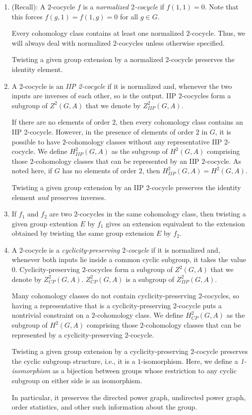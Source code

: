 \documentclass[10pt]{amsart}
\begin{document}
\begin{enumerate}
\item (Recall): A $2$-cocycle $f$ is a {\em normalized $2$-cocycle} if
  $f(1,1) = 0$. Note that this forces $f(g,1) = f(1,g) = 0$ for all $g
  \in G$.

  Every cohomology class contains at least one normalized
  $2$-cocycle. Thus, we will always deal with normalized $2$-cocycles
  unless otherwise specified.

  Twisting a given group extension by a normalized 2-cocycle preserves
  the identity element.

\item A $2$-cocycle is an {\em IIP 2-cocycle} if it is normalized and,
  whenever the two inputs are inverses of each other, so is the
  output. IIP 2-cocycles form a subgroup of $Z^2(G,A)$ that we denote
  by $Z^2_{IIP}(G,A)$.

  If there are no elements of order $2$, then every cohomology class
  contains an IIP 2-cocycle. However, in the presence of elements of
  order $2$ in $G$, it is possible to have $2$-cohomology classes
  without any representative IIP 2-cocycle. We define $H^2_{IIP}(G,A)$
  as the subgroup of $H^2(G,A)$ comprising those $2$-cohomology
  classes that can be represented by an IIP $2$-cocycle. As noted
  here, if $G$ has no elements of order $2$, then $H^2_{IIP}(G,A) =
  H^2(G,A)$.

  Twisting a given group extension by an IIP 2-cocycle preserves the
  identity element {\em and} preserves inverses.
\item If $f_1$ and $f_2$ are two $2$-cocycles in the same cohomology
  class, then twisting a given group extention $E$ by $f_1$ gives an
  extension equivalent to the extension obtained by twisting the same
  group extension $E$ by $f_2$.

\item A $2$-cocycle is a {\em cyclicity-preserving $2$-cocycle} if it
  is normalized and, whenever both inputs lie inside a common cyclic
  subgroup, it takes the value $0$. Cyclicity-preserving $2$-cocycles
  form a subgroup of $Z^2(G,A)$ that we denote by
  $Z^2_{CP}(G,A)$. $Z^2_{CP}(G,A)$ is a subgroup of $Z^2_{IIP}(G,A)$.
   
  Many cohomology classes do not contain cyclicity-preserving
  $2$-cocycles, so having a representative that is a
  cyclicity-preserving $2$-cocycle puts a nontrivial constraint on a
  $2$-cohomology class. We define $H^2_{CP}(G,A)$ as the subgroup of
  $H^2(G,A)$ comprising those $2$-cohomology classes that can be
  represented by a cyclicity-preserving $2$-cocycle.

  Twisting a given group extension by a cyclicity-preserving
  $2$-cocycle preserves the cyclic subgroup structure, i.e., it is a
  $1$-isomorphism. Here, we define a {\em 1-isomorphism} as a
  bijection between groups whose restriction to any cyclic subgroup on
  either side is an isomorphism.

  In particular, it preserves the directed power graph, undirected
  power graph, order statistics, and other such information about the
  group.
\end{enumerate}
\end{document}
